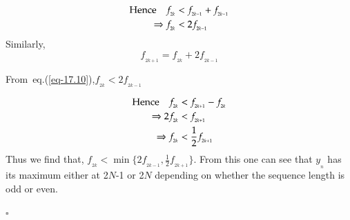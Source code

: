 \begin{multicols}{2}
\vspace{-.6cm}

\begin{align}
\textup{Hence}\quad f_{_{2k}} &< f_{_{2k-1}} + f_{_{2k-1}}\nonumber\\
\Rightarrow  f_{_{2k}} &< 2f_{_{2k-1}}\label{eq-17.10}
\end{align}
Similarly,
\begin{equation}
f_{_{2k+1}} = f_{_{2k}} + 2f_{_{2k-1}}\label{eq-17.11}
\end{equation}

\textup{From~eq.(\ref{eq-17.10})},\quad $f_{_{2k}} < 2f_{_{2k-1}}$

\vspace{-.6cm}

\begin{align}
\textup{Hence}\quad f_{_{2k}} &< f_{_{2k+1}} - f_{_{2k}} \nonumber\\
\Rightarrow 2f_{_{2k}} &< f_{_{2k+1}}\nonumber\\
\Rightarrow f_{_{2k}} &< \frac{1}{2}f_{_{2k+1}}\label{eq-17.12}
\end{align}
Thus we find that, $f_{_{2k}} < \min\{2f_{_{2k-1}}, \frac{1}{2}f_{_{2k+1}}\}$. From this one can see that $y_{_n}$ has its maximum either at 2$N$-1 or 2$N$ depending on whether the sequence length is odd or even.

\hfill{$\square$}

\vspace{-.6cm}


\end{multicols}

